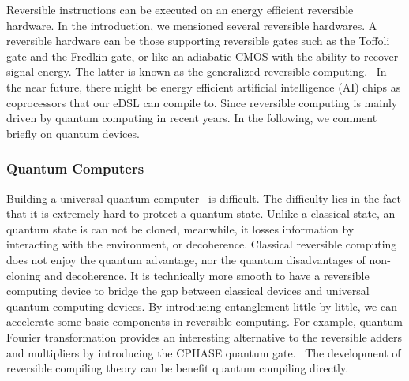 \documentclass[aps,twocolumn,longbibliography,english,superscriptaddress]{revtex4-1}
\newcommand{\<}{\langle}
\renewcommand{\>}{\rangle}
\theoremstyle{definition}\newtheorem{definition}{\textit{Definition}}
\begin{document}
Reversible instructions can be executed on an energy efficient reversible hardware.
In the introduction, we mensioned several reversible hardwares. A reversible hardware can be those supporting reversible gates such as the Toffoli gate and the Fredkin gate, or like an adiabatic CMOS with the ability to recover signal energy. The latter is known as the generalized reversible computing.~\cite{Frank2005,Frank2017b}
In the near future, there might be energy efficient artificial intelligence (AI) chips as coprocessors that our eDSL can compile to.
Since reversible computing is mainly driven by quantum computing in recent years.
In the following, we comment briefly on quantum devices.

\subsubsection{Quantum Computers}\label{sec:qc}
Building a universal quantum computer~\cite{Nielsen2002} is difficult. 
The difficulty lies in the fact that it is extremely hard to protect a quantum state.
Unlike a classical state, an quantum state is can not be cloned, meanwhile, it losses information by interacting with the environment, or decoherence.
Classical reversible computing does not enjoy the quantum advantage, nor the quantum disadvantages of non-cloning and decoherence.
It is technically more smooth to have a reversible computing device to bridge the gap between classical devices and universal quantum computing devices.
By introducing entanglement little by little, we can accelerate some basic components in reversible computing. For example, quantum Fourier transformation provides an interesting alternative to the reversible adders and multipliers by introducing the CPHASE quantum gate.~\cite{RuizPerez2017}
The development of reversible compiling theory can be benefit quantum compiling directly.
\end{document}
